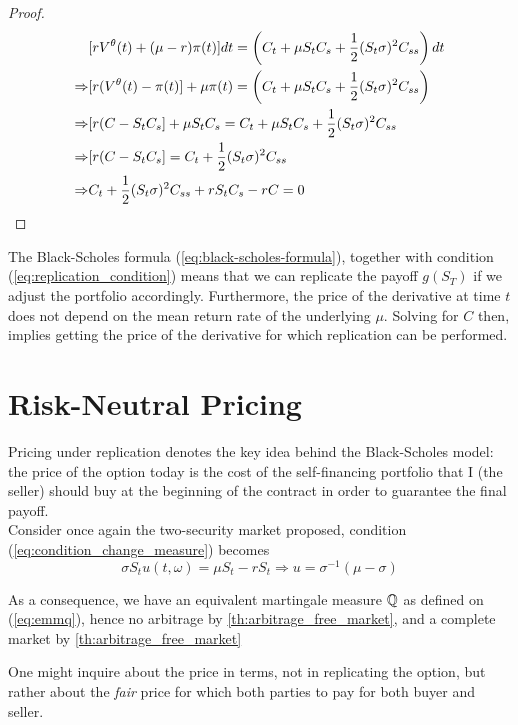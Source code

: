 \documentclass[../TGMAFFIRO.tex]{subfiles}
\begin{document}
\begin{proof}
	\begin{align}
		&[rV^\theta(t) + (\mu - r) \pi(t)] dt = \left(C_t + \mu S_t C_s + \frac{1}{2}(S_t\sigma)^2C_{ss} \right) dt\nonumber\\
		\Rightarrow & [r(V^\theta(t) - \pi(t)] + \mu\pi(t) = \left(C_t + \mu S_t C_s + \frac{1}{2}(S_t\sigma)^2C_{ss} \right) \nonumber\\
		\Rightarrow &[r(C - S_t C_s] + \mu S_t C_s = C_t + \mu S_t C_s + \frac{1}{2}(S_t\sigma)^2C_{ss} \nonumber \\
		\Rightarrow &[r(C - S_t C_s] = C_t + \frac{1}{2}(S_t\sigma)^2C_{ss} \nonumber \\
		\Rightarrow & C_t + \frac{1}{2}(S_t\sigma)^2C_{ss} + rS_t C_s - rC = 0
	\end{align}
 \end{proof}
 
 \begin{remark}
 	The Black-Scholes formula (\ref{eq:black-scholes-formula}), together with condition (\ref{eq:replication_condition}) means that we can replicate the payoff $g(S_T)$ if we adjust the portfolio accordingly. Furthermore, the price of the derivative at time $t$ does not depend on the mean return rate of the underlying $\mu$. Solving for $C$ then, implies getting the price of the derivative for which replication can be performed.
 \end{remark}
 
 \section{Risk-Neutral Pricing}
  Pricing under replication denotes the key idea behind the Black-Scholes model: the price of the option today is the cost of the self-financing portfolio that I (the seller) should buy at the beginning of the contract in order to guarantee the final payoff.\\
 
  Consider once again the two-security market proposed, condition (\ref{eq:condition_change_measure}) becomes
\[
	\sigma S_t u(t,\omega) = \mu S_t - r S_t \Rightarrow u = \sigma^{-1}(\mu - \sigma)
\]


As a consequence, we have an equivalent martingale measure $\mathbb{Q}$ as defined on (\ref{eq:emmq}), hence no arbitrage by \ref{th:arbitrage_free_market}, and a complete market by \ref{th:arbitrage_free_market}

 
 One might inquire about the price in terms, not in replicating the option, but rather about the \textit{fair} price for which both parties to pay for both buyer and seller. 
 
\end{document}
